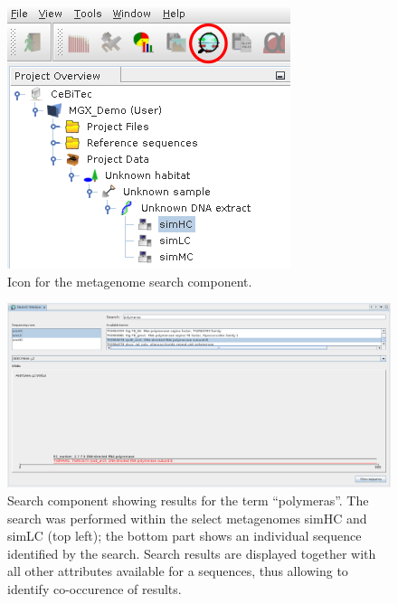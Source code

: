 \begin{figure}[H]
\centering
\includegraphics[width=.5\textwidth]{img/mgx/SearchOpen}
\caption[Metagenome search]{Icon for the metagenome search component.}
\label{search1}
\end{figure}

\begin{figure}[H]
\centering
\includegraphics[width=.9\textwidth]{img/mgx/SearchTC}
\caption[Metagenome search]{Search component showing results for the term ``polymeras''. The search was performed
within the select metagenomes simHC and simLC (top left); the bottom part shows an individual sequence identified
by the search. Search results are displayed together with all other attributes available for a sequences, thus allowing
to identify co-occurence of results.}
\label{search2}
\end{figure}

